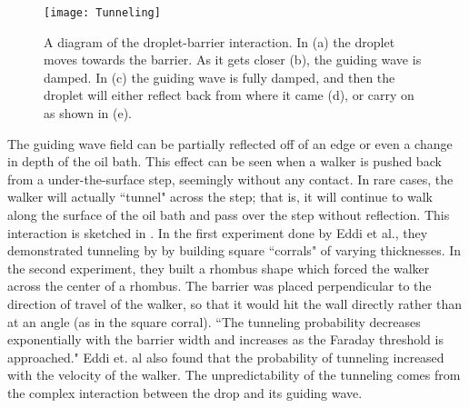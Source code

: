 \begin{figure}[h!]
 \centering
	    \texttt{[image: Tunneling]}
	     \caption{A diagram of the droplet-barrier interaction. In (a) the droplet moves towards the barrier. As it gets closer (b), the guiding wave is damped. In (c) the guiding wave is fully damped, and then the droplet will either reflect back from where it came (d), or carry on as shown in (e).}
	 \label{tuncartoon}
	\end{figure}
	       The guiding wave field can be partially reflected off of an edge or even a change in depth of the oil bath. This effect can be seen when a walker is pushed back from a under-the-surface step, seemingly without any contact. In rare cases, the walker will actually ``tunnel" across the step; that is, it will continue to walk along the surface of the oil bath and pass over the step without reflection. This interaction is sketched in . In the first experiment done by Eddi et al., they demonstrated tunneling by by building square ``corrals" of varying thicknesses\cite{tunneling}. In the second experiment, they built a rhombus shape which forced the walker across the center of a rhombus. The barrier was placed perpendicular to the direction of travel of the walker, so that it would hit the wall directly rather than at an angle (as in the square corral). ``The tunneling probability decreases exponentially with the barrier width and increases as the Faraday threshold is approached." Eddi et. al also found that the probability of tunneling increased with the velocity of the walker.  The unpredictability of the tunneling comes from the complex interaction between the drop and its guiding wave. 


